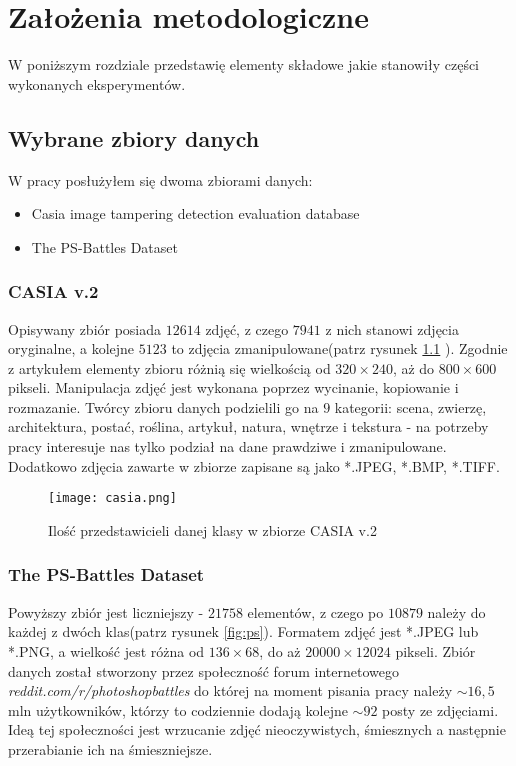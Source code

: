 \chapter{Założenia metodologiczne}

W poniższym rozdziale przedstawię elementy składowe jakie stanowiły części wykonanych eksperymentów.

\section{Wybrane zbiory danych}

W pracy posłużyłem się dwoma zbiorami danych:
\begin{itemize}
	\item Casia image tampering detection evaluation database \cite{casia}
	\item The PS-Battles Dataset \cite{ps}
\end{itemize}

\subsection{CASIA v.2}

Opisywany zbiór posiada $12 614$ zdjęć, z czego $7 941$ z nich stanowi zdjęcia oryginalne, a kolejne $5 123$ to zdjęcia zmanipulowane(patrz rysunek \ref{fig:casia} ). Zgodnie z artykułem \cite{casia} elementy zbioru różnią się wielkością od $320 \times 240$, aż do $800 \times 600$ pikseli. Manipulacja zdjęć jest wykonana poprzez wycinanie, kopiowanie i rozmazanie. Twórcy zbioru danych podzielili go na $9$ kategorii: scena, zwierzę, architektura, postać, roślina, artykuł, natura, wnętrze i tekstura - na potrzeby pracy interesuje nas tylko podział na dane prawdziwe i zmanipulowane. Dodatkowo zdjęcia zawarte w zbiorze zapisane są jako *.JPEG, *.BMP, *.TIFF.

\begin{figure}[h!]
	\texttt{[image: casia.png]}
	\centering
	\caption{Ilość przedstawicieli danej klasy w zbiorze CASIA v.2}
	\label{fig:casia}
\end{figure}

\subsection{The PS-Battles Dataset}

Powyższy zbiór jest liczniejszy - $21 758$ elementów, z czego po $10 879$ należy do każdej z dwóch klas(patrz rysunek \ref{fig:ps}). Formatem zdjęć jest *.JPEG lub *.PNG, a wielkość jest różna od $136 \times 68$, do aż $20 000 \times 12 024$ pikseli. Zbiór danych został stworzony przez społeczność forum internetowego \textit{reddit.com/r/photoshopbattles} do której na moment pisania pracy należy $\sim16,5$ mln użytkowników, którzy to codziennie dodają kolejne $\sim92$ posty ze zdjęciami. Ideą tej społeczności jest wrzucanie zdjęć nieoczywistych, śmiesznych a następnie przerabianie ich na śmieszniejsze.

